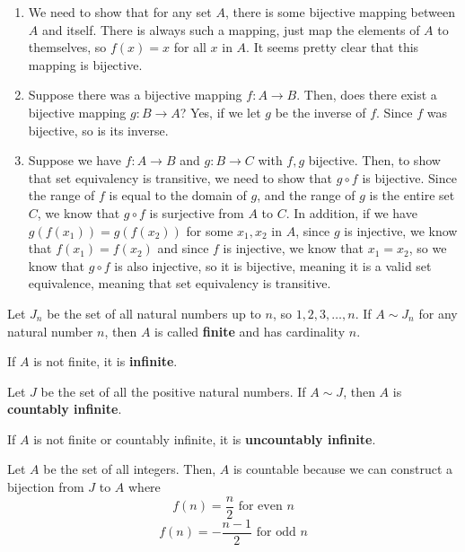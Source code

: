 \documentclass{article}
\begin{document}
\begin{customproof}

\begin{enumerate}
	\item We need to show that for any set $A$, there is some bijective mapping between $A$ and itself. There is always such a mapping, just map the elements of $A$ to themselves, so $f(x) = x$ for all $x$ in $A$. It seems pretty clear that this mapping is bijective.
	\item Suppose there was a bijective mapping $f: A \to B$. Then, does there exist a bijective mapping $g: B \to A$? Yes, if we let $g$ be the inverse of $f$. Since $f$ was bijective, so is its inverse.

\item Suppose we have $f: A \to B$ and $g: B \to C$ with $f, g$ bijective. Then, to show that set equivalency is transitive, we need to show that $g \circ f$ is bijective. Since the range of $f$ is equal to the domain of $g$, and the range of $g$ is the entire set $C$, we know that $g \circ f$ is surjective from $A$ to $C$. In addition, if we have $g(f(x_1)) = g(f(x_2))$ for some $x_1, x_2$ in $A$, since $g$ is injective, we know that $f(x_1) = f(x_2)$ and since $f$ is injective, we know that $x_1 = x_2$, so we know that $g \circ f$ is also injective, so it is bijective, meaning it is a valid set equivalence, meaning that set equivalency is transitive.
\end{enumerate}
\end{customproof}

\begin{definition}

	Let $J_n$ be the set of all natural numbers up to $n$, so $1,2,3, \dots ,n$. If $A \sim J_n$ for any natural number $n$, then $A$ is called \textbf{finite} and has cardinality $n$. 

	If $A$ is not finite, it is \textbf{infinite}. 

	Let $J$ be the set of all the positive natural numbers. If $A \sim J$, then $A$ is \textbf{countably infinite}.

	If $A$ is not finite or countably infinite, it is \textbf{uncountably infinite}.
\end{definition}


\begin{example}
	Let $A$ be the set of all integers. Then, $A$ is countable because we can construct a bijection from $J$ to $A$ where $$f(n) = \frac{n}{2} \text{ for even }n$$
	$$f(n) = -\frac{n-1}{2} \text{ for odd } n$$ 
\end{example}
\end{document}
